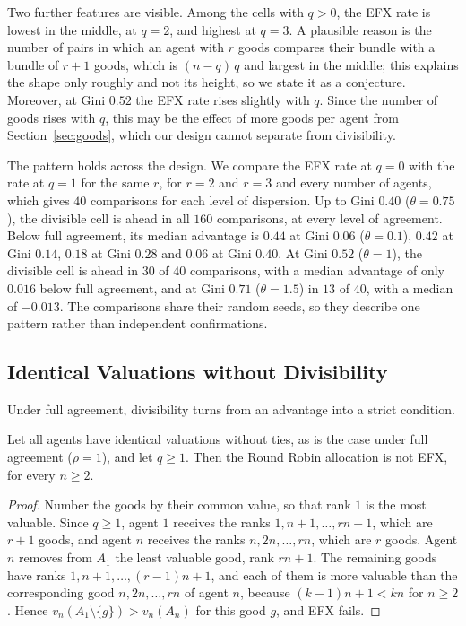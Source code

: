 Two further features are visible. Among the cells with $q>0$, the EFX rate is lowest in the
middle, at $q=2$, and highest at $q=3$. A plausible reason is the number of pairs in which an
agent with $r$ goods compares their bundle with a bundle of $r+1$ goods, which is $(n-q)\,q$ and
largest in the middle; this explains the shape only roughly and not its height, so we state it as
a conjecture. Moreover, at Gini $0.52$ the EFX rate rises slightly with $q$. Since the number of
goods rises with $q$, this may be the effect of more goods per agent from
Section~\ref{sec:goods}, which our design cannot separate from divisibility.

The pattern holds across the design. We compare the EFX rate at $q=0$ with the rate at $q=1$ for
the same $r$, for $r=2$ and $r=3$ and every number of agents, which gives $40$ comparisons for
each level of dispersion. Up to Gini $0.40$ ($\theta=0.75$), the divisible cell is ahead in all
$160$ comparisons, at every level of agreement. Below full agreement, its median advantage is $0.44$
at Gini $0.06$ ($\theta=0.1$), $0.42$ at Gini $0.14$, $0.18$ at Gini $0.28$ and $0.06$ at Gini
$0.40$. At Gini $0.52$ ($\theta=1$), the divisible cell is ahead in $30$ of $40$ comparisons, with
a median advantage of only $0.016$ below full agreement, and at Gini $0.71$ ($\theta=1.5$) in $13$ of
$40$, with a median of $-0.013$. The comparisons share their random seeds, so they
describe one pattern rather than independent confirmations.

\subsection{Identical Valuations without Divisibility}\label{sec:divisibility-identical}

Under full agreement, divisibility turns from an advantage into a strict condition.

\begin{proposition}\label{prop:identical}
Let all agents have identical valuations without ties, as is the case under full agreement
($\rho=1$), and let $q\geq1$. Then the Round Robin
allocation is not EFX, for every $n\geq2$.
\end{proposition}

\begin{proof}
Number the goods by their common value, so that rank $1$ is the most valuable. Since $q\geq1$,
agent $1$ receives the ranks $1,n+1,\dots,rn+1$, which are $r+1$ goods, and agent $n$ receives the
ranks $n,2n,\dots,rn$, which are $r$ goods. Agent $n$ removes from $A_1$ the least valuable good,
rank $rn+1$. The remaining goods have ranks $1,n+1,\dots,(r-1)n+1$, and each of them is more
valuable than the corresponding good $n,2n,\dots,rn$ of agent $n$, because $(k-1)n+1<kn$ for
$n\geq2$. Hence $v_n(A_1\setminus\{g\})>v_n(A_n)$ for this good $g$, and EFX fails.
\end{proof}

